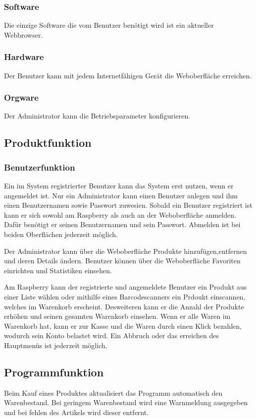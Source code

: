 \documentclass[11pt,a4paper]{article} %
\begin{document}
\subsubsection{Software}
Die einzige Software die vom Benutzer ben\"otigt wird ist ein aktueller Webbrowser.

\subsubsection{Hardware}
Der Benutzer kann mit jedem Internetf\"ahigen Ger\"at die Weboberfl\"ache erreichen.

\subsubsection{Orgware}
Der Administrator kann die Betriebsparameter konfigurieren.

\subsection{Produktfunktion}
\subsubsection{Benutzerfunktion}
Ein im System registrierter Benutzer kann das System erst nutzen, wenn er angemeldet ist.
Nur ein Administrator kann einen Benutzer anlegen und ihm einen Benutzernamen sowie Passwort zuwesien. Sobald ein Benutzer registriert ist kann er sich sowohl am Raspberry als auch an der Weboberfl\"ache anmelden. Daf\"ur ben\"otigt er seinen Benutzernamen und sein Passwort. Abmelden ist bei beiden Oberfl\"achen jederzeit m\"oglich.
\par
Der Administrator kann \"uber die Weboberfl\"ache Produkte hinzuf\"ugen,entfernen und deren Details \"andern. Benutzer k\"onnen \"uber die Weboberfl\"ache Favoriten einrichten und Statistiken einsehen.
\par
Am Raspberry kann der registrierte und angemeldete Benutzer ein Produkt aus einer Liste w\"ahlen oder mithilfe eines Barcodescanners ein Prdoukt einscannen, welches im Warenkorb erscheint. Desweiteren kann er die Anzahl der Produkte erh\"ohen und seinen gesamten Warenkorb einsehen. Wenn er alle Waren im Warenkorb hat, kann er zur Kasse und die Waren durch einen Klick bezahlen, wodurch sein Konto belastet wird. Ein Abbruch oder das erreichen des Hauptmen\"us ist jederzeit m\"oglich.

\subsection{Programmfunktion}
Beim Kauf eines Produktes aktualisiert das Programm automatisch den Warenbestand. Bei geringem Warenbestand wird eine Warnmeldung ausgegeben und bei fehlen des Artikels wird dieser entfernt.
\end{document}
